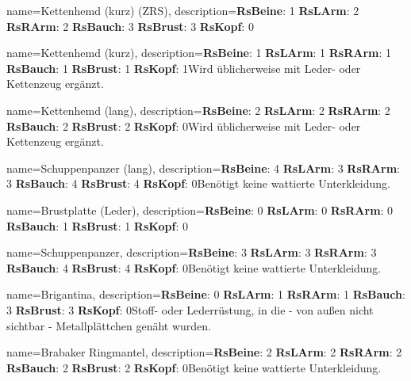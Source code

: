 {
    name={Kettenhemd (kurz) (ZRS)},
    description={\textbf{RsBeine}: 1 \textbf{RsLArm}: 2 \textbf{RsRArm}: 2 \textbf{RsBauch}: 3 \textbf{RsBrust}: 3 \textbf{RsKopf}: 0\newline }
}


{
    name={Kettenhemd (kurz)},
    description={\textbf{RsBeine}: 1 \textbf{RsLArm}: 1 \textbf{RsRArm}: 1 \textbf{RsBauch}: 1 \textbf{RsBrust}: 1 \textbf{RsKopf}: 1\newline Wird üblicherweise mit Leder- oder Kettenzeug ergänzt.}
}


{
    name={Kettenhemd (lang)},
    description={\textbf{RsBeine}: 2 \textbf{RsLArm}: 2 \textbf{RsRArm}: 2 \textbf{RsBauch}: 2 \textbf{RsBrust}: 2 \textbf{RsKopf}: 0\newline Wird üblicherweise mit Leder- oder Kettenzeug ergänzt.}
}


{
    name={Schuppenpanzer (lang)},
    description={\textbf{RsBeine}: 4 \textbf{RsLArm}: 3 \textbf{RsRArm}: 3 \textbf{RsBauch}: 4 \textbf{RsBrust}: 4 \textbf{RsKopf}: 0\newline Benötigt keine wattierte Unterkleidung.}
}


{
    name={Brustplatte (Leder)},
    description={\textbf{RsBeine}: 0 \textbf{RsLArm}: 0 \textbf{RsRArm}: 0 \textbf{RsBauch}: 1 \textbf{RsBrust}: 1 \textbf{RsKopf}: 0\newline }
}


{
    name={Schuppenpanzer},
    description={\textbf{RsBeine}: 3 \textbf{RsLArm}: 3 \textbf{RsRArm}: 3 \textbf{RsBauch}: 4 \textbf{RsBrust}: 4 \textbf{RsKopf}: 0\newline Benötigt keine wattierte Unterkleidung.}
}


{
    name={Brigantina},
    description={\textbf{RsBeine}: 0 \textbf{RsLArm}: 1 \textbf{RsRArm}: 1 \textbf{RsBauch}: 3 \textbf{RsBrust}: 3 \textbf{RsKopf}: 0\newline Stoff- oder Lederrüstung, in die - von außen nicht sichtbar - Metallplättchen genäht wurden.}
}


{
    name={Brabaker Ringmantel},
    description={\textbf{RsBeine}: 2 \textbf{RsLArm}: 2 \textbf{RsRArm}: 2 \textbf{RsBauch}: 2 \textbf{RsBrust}: 2 \textbf{RsKopf}: 0\newline Benötigt keine wattierte Unterkleidung.}
}



